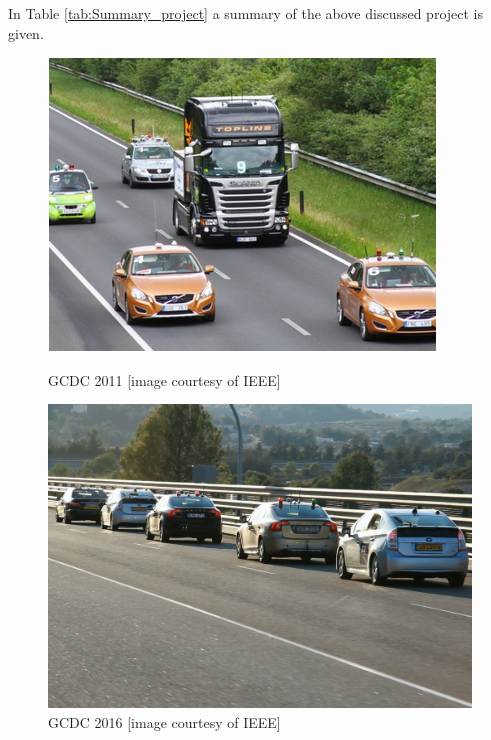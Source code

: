 In Table \ref{tab:Summary_project} a summary of the above discussed project is given. 


\begin{figure}[ht]
\begin{minipage}[b]{0.45\linewidth}
\centering
\includegraphics[width=\textwidth]{chapters/Chapitre_2/Figures/GCDC2011.png}
\caption{GCDC 2011 [image courtesy of IEEE]}
\label{fig:GCDC2011}
\end{minipage}
\hspace{0.5cm}
\begin{minipage}[b]{0.45\linewidth}
\centering
\includegraphics[width=1.05\textwidth]{chapters/Chapitre_2/Figures/GCDC2016.jpeg}
\caption{GCDC 2016 [image courtesy of IEEE]}
\label{fig:GCDC2016}
\end{minipage}
\end{figure}




